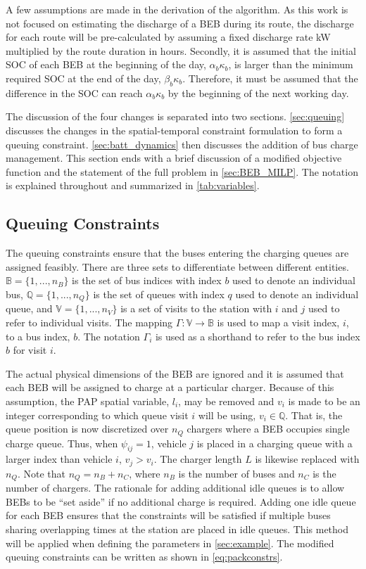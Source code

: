 \documentclass[utf8]{FrontiersinHarvard}
\begin{document}
A few assumptions are made in the derivation of the algorithm. As this work is not focused on estimating the discharge
of a BEB during its route, the discharge for each route will be pre-calculated by assuming a fixed discharge rate kW
multiplied by the route duration in hours. Secondly, it is assumed that the initial SOC of each BEB at the beginning of
the day, $\alpha_b\kappa_b$, is larger than the minimum required SOC at the end of the day, $\beta_b\kappa_b$.
Therefore, it must be assumed that the difference in the SOC can reach $\alpha_b\kappa_b$ by the beginning of the next
working day.

The discussion of the four changes is separated into two sections. \autoref{sec:queuing} discusses the changes in the
spatial-temporal constraint formulation to form a queuing constraint. \autoref{sec:batt_dynamics} then discusses the
addition of bus charge management. This section ends with a brief discussion of a modified objective function and the
statement of the full problem in \autoref{sec:BEB_MILP}. The notation is explained throughout and summarized in
\autoref{tab:variables}.

\subsection{Queuing Constraints}
\label{sec:queuing}
\noindent The queuing constraints ensure that the buses entering the charging queues are assigned
feasibly. There are three sets to differentiate between different entities. \(\mathbb{B} = \{1, ..., n_B\}\) is the set of
bus indices with index \(b\) used to denote an individual bus, \(\mathbb{Q} = \{1, ..., n_Q\}\) is the set of queues with index \(q\)
used to denote an individual queue, and \(\mathbb{V} = \{1, ..., n_V\}\) is a set of visits to the station with \(i\) and
\(j\) used to refer to individual visits. The mapping \(\Gamma: \mathbb{V} \rightarrow \mathbb{B}\) is used to map a visit
index, \(i\), to a bus index, \(b\). The notation \(\Gamma_i\) is used as a shorthand to refer to the bus index \(b\) for visit
\(i\).

The actual physical dimensions of the BEB are ignored and it is assumed that each BEB will be assigned to charge at a
particular charger. Because of this assumption, the PAP spatial variable, \(l_i\), may be removed and \(v_i\) is made to be
an integer corresponding to which queue visit \(i\) will be using, \(v_i \in \mathbb{Q}\). That is, the queue position is now
discretized over \(n_Q\) chargers where a BEB occupies single charge queue. Thus, when \(\psi_{ij} = 1\), vehicle \(j\) is placed
in a charging queue with a larger index than vehicle \(i\), \(v_j > v_i\). The charger length \(L\) is likewise replaced with
\(n_Q\). Note that \(n_Q = n_B + n_C\), where \(n_B\) is the number of buses and \(n_C\) is the number of chargers. The
rationale for adding additional idle queues is to allow BEBs to be ``set aside'' if no additional charge is required.
Adding one idle queue for each BEB ensures that the constraints will be satisfied if multiple buses sharing overlapping
times at the station are placed in idle queues. This method will be applied when defining the parameters in
\autoref{sec:example}. The modified queuing constraints can be written as shown in \autoref{eq:packconstrs}.
\end{document}
